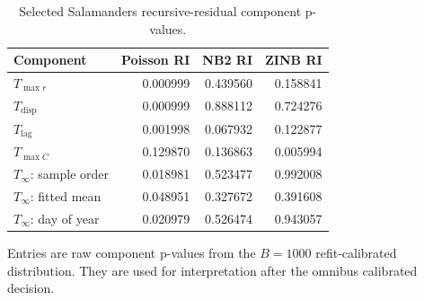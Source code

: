 \begin{table}[H]
\centering
\small
\caption{Selected Salamanders recursive-residual component p-values.}
\label{tab:empirical-salamanders-components}
\begin{tabular}{lrrr}
\toprule
Component & Poisson RI & NB2 RI & ZINB RI \\
\midrule
$T_{\max r}$ & 0.000999 & 0.439560 & 0.158841 \\
$T_{\mathrm{disp}}$ & 0.000999 & 0.888112 & 0.724276 \\
$T_{\mathrm{lag}}$ & 0.001998 & 0.067932 & 0.122877 \\
$T_{\max C}$ & 0.129870 & 0.136863 & 0.005994 \\
$T_{\infty}$: sample order & 0.018981 & 0.523477 & 0.992008 \\
$T_{\infty}$: fitted mean & 0.048951 & 0.327672 & 0.391608 \\
$T_{\infty}$: day of year & 0.020979 & 0.526474 & 0.943057 \\
\bottomrule
\end{tabular}
\par\vspace{0.5ex}\footnotesize{Entries are raw component p-values from the $B=1000$ refit-calibrated distribution. They are used for interpretation after the omnibus calibrated decision.}
\end{table}
